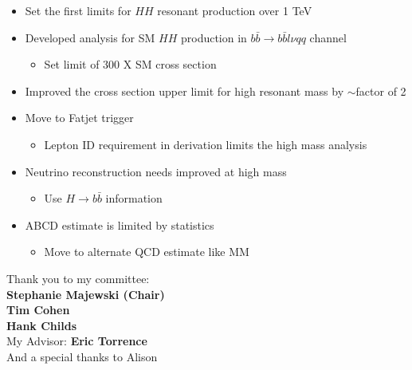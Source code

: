 \documentclass{beamer}
\newcommand*{\header}[1]{\fontsize{16}{8}\selectfont \textbf{{\color{MyPurple}{#1}}}}
\begin{document}
\begin{frame}
\begin{columns}
\begin{column}{0.5\textwidth}
\begin{center}
\end{center}
\end{column}
\end{columns}
\end{frame}

\begin{frame}
\begin{center}
\header{Conclusion}
\end{center}
\begin{itemize}
\item Set the first limits for $HH$ resonant production over 1 TeV
\item Developed analysis for SM $HH$ production in $b\bar{b}\rightarrow{}b\bar{b}l\nu{}qq$ channel
\begin{itemize}
\item Set limit of 300 X SM cross section
\end{itemize}
\item Improved the cross section upper limit for high resonant mass by $\sim$factor of 2
\end{itemize}
\end{frame}

\begin{frame}
\begin{center}
\header{Outlook}
\end{center}
\begin{itemize}
\item Move to Fatjet trigger
\begin{itemize}
\item Lepton ID requirement in derivation limits the high mass analysis
\end{itemize}
\item Neutrino reconstruction needs improved at high mass
\begin{itemize}
\item Use $H\rightarrow{}b\bar{b}$ information
\end{itemize}
\item ABCD estimate is limited by statistics
\begin{itemize}
\item Move to alternate QCD estimate like MM
\end{itemize}
\end{itemize}
\end{frame}

\begin{frame}
\begin{center}
Thank you to my committee:\\
\textbf{Stephanie Majewski (Chair)}\\
\textbf{Tim Cohen}\\
\textbf{Hank Childs}\\
My Advisor: \textbf{Eric Torrence}\\
And a special thanks to Alison
\end{center}
\end{frame}
\end{document}
